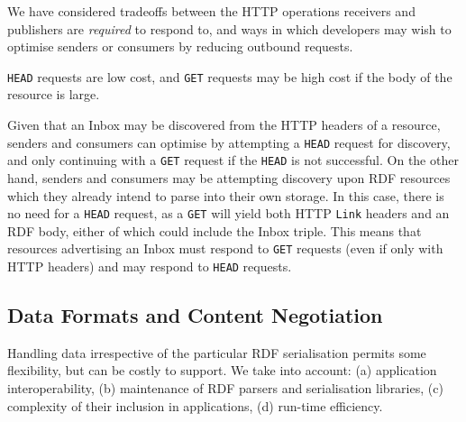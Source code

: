 \par We have considered tradeoffs between the HTTP operations receivers and publishers are {\em required} to respond to, and ways in which developers may wish to optimise senders or consumers by reducing outbound requests.

                                    
\par 
                                        
                                        {\tt HEAD} requests are low cost, and {\tt GET} requests may be high cost if the body of the resource is large.

                                        Given that an Inbox may be discovered from the HTTP headers of a resource, senders and consumers can optimise by attempting a {\tt HEAD} request for discovery, and only continuing with a {\tt GET} request if the {\tt HEAD} is not successful. On the other hand, senders and consumers may be attempting discovery upon RDF resources which they already intend to parse into their own storage. In this case, there is no need for a {\tt HEAD} request, as a {\tt GET} will yield both HTTP {\tt Link} headers and an RDF body, either of which could include the Inbox triple. This means that resources advertising an Inbox must respond to {\tt GET} requests (even if only with HTTP headers) and may respond to {\tt HEAD} requests.
                                    
                                
                            

                            
                                \subsection{Data Formats and Content Negotiation}
  \label{data-formats}

                                
                                    
\par Handling data irrespective of the particular RDF serialisation permits some flexibility, but can be costly to support. We take into account: (a) application interoperability, (b) maintenance of RDF parsers and serialisation libraries, (c) complexity of their inclusion in applications, (d) run-time efficiency.

                                    
\par 
                                        
